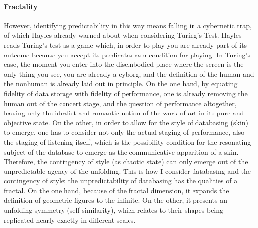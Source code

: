 
\paragraph{Fractality}
However, identifying predictability in this way means falling in a cybernetic trap, of which Hayles already warned about when considering Turing's Test. Hayles reads Turing's test as a game which, in order to play you are already part of its outcome because you accept its predicates as a condition for playing. In Turing's case, the moment you enter into the disembodied place where the screen is the only thing you see, you are already a cyborg, and the definition of the human and the nonhuman is already laid out in principle. On the one hand, by equating fidelity of data storage with fidelity of performance, one is already removing the human out of the concert stage, and the question of performance altogether, leaving only the idealist and romantic notion of the work of art in its pure and objective state. On the other, in order to allow for the style of databasing (skin) to emerge, one has to consider not only the actual staging of performance, also the staging of listening itself, which is the possibility condition for the resonating subject of the database to emerge as the communicative apparition of a skin. Therefore, the contingency of style (as chaotic state) can only emerge out of the unpredictable agency of the unfolding. This is how I consider databasing and the contingency of style: the unpredictability of databasing has the qualities of a fractal. On the one hand, because of the fractal dimension, it expands the definition of geometric figures to the infinite. On the other, it presents an unfolding symmetry (self-similarity), which relates to their shapes being replicated nearly exactly in different scales. 

